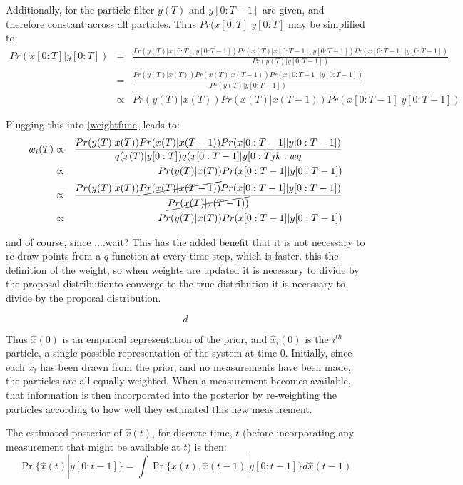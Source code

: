 \documentclass{article}
\begin{document}
Additionally, for the particle filter $y(T)$ and $y[0:T-1]$ are 
given, and therefore constant across all particles. Thus $Pr(x[0:T] | y[0:T]$
may be simplified to:
\begin{eqnarray}
Pr(x[0:T] | y[0:T]) & = & \frac{Pr(y(T)| x[0:T], y[0:T-1]) Pr(x(T) | x[0:T-1], y[0:T-1]) 
            Pr(x[0:T-1] | y[0:T-1])}{Pr(y(T) | y[0:T-1])} \nonumber \\
& = & \frac{Pr(y(T)| x(T)) Pr(x(T) | x(T-1)) Pr(x[0:T-1] | y[0:T-1])}{Pr(y(T) | y[0:T-1])} \nonumber \\
& \propto & Pr(y(T)| x(T)) Pr(x(T) | x(T-1)) Pr(x[0:T-1] | y[0:T-1])
\end{eqnarray}

Plugging this into \ref{weightfunc} leads to:
\begin{eqnarray}
w_i(T) & \propto & \frac{Pr(y(T)| x(T)) Pr(x(T) | x(T-1)) Pr(x[0:T-1] | y[0:T-1])}{q(x(T) | y[0:T])q(x[0:T-1] | y[0:Tjk:wq
} \nonumber \\
& \propto & Pr(y(T)| x(T)) Pr(x[0:T-1] | y[0:T-1]) \\
& \propto & \frac{Pr(y(T)| x(T)) \cancel{Pr(x(T) | x(T-1))} Pr(x[0:T-1] | y[0:T-1])}{\cancel{Pr(x(T) | x(T-1))}} \nonumber \\
& \propto & Pr(y(T)| x(T)) Pr(x[0:T-1] | y[0:T-1]) \\
\end{eqnarray}

and of course, since ....wait?
This has the added benefit that it is not necessary to
re-draw points from a $q$ function at every time step, which is faster. 
this the definition of the weight, so when weights are updated it is necessary
to divide by the proposal distributionto converge
to the true distribution it is necessary to divide by the proposal distribution.


\begin{equation}
  d
\end{equation}

Thus $\hat{x}(0)$ is an empirical representation of the prior, and $\hat{x}_i(0)$
is the $i^{th}$ particle, a single possible representation of the system at time 0.
Initially, since each $\hat{x}_i$ has been drawn from the prior, and no measurements
have been made, the particles are all equally weighted. When a measurement becomes
available, that information is then incorporated into the posterior by re-weighting
the particles according to how well they estimated this new measurement. 

The estimated posterior of $\hat{x}(t)$, for discrete time, $t$ (before incorporating
any measurement that might be available at $t$) is then:
\begin{equation}
\Pr\{\hat{x}(t) | y[0:t-1]\} =  \int \Pr\{\hat{x}(t), \hat{x}(t-1) | y[0:t-1]\} d\hat{x}(t-1)
\end{equation}
\end{document}
